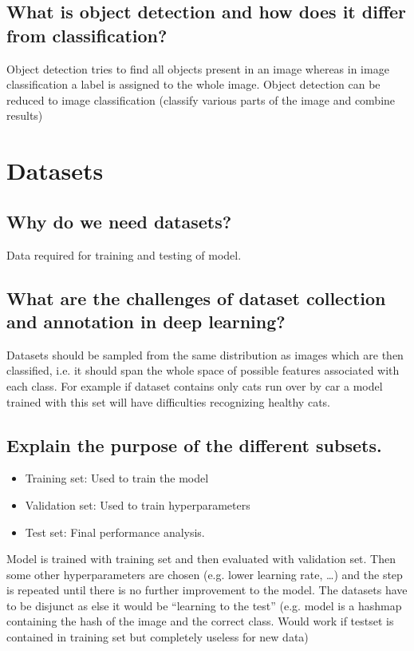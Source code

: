 \subsection{What is object detection and how does it differ from classification?}
Object detection tries to find all objects present in an image whereas in image classification a label is assigned to the whole image. Object detection can be reduced to image classification (classify various parts of the image and combine results)

%
\section{Datasets}
\subsection{Why do we need datasets?}
Data required for training and testing of model. 
\subsection{What are the challenges of dataset collection and annotation in deep learning?}Datasets should be sampled from the same distribution as images which are then classified, i.e. it should span the whole space of possible features associated with each class. For example if dataset contains only cats run over by car a model trained with this set will have difficulties recognizing healthy cats.
\subsection{Explain the purpose of the different subsets.}
\begin{itemize}
\item Training set: Used to train the model
\item Validation set: Used to train hyperparameters
\item Test set: Final performance analysis. 
\end{itemize}
Model is trained with training set and then evaluated with validation set. Then some other hyperparameters are chosen (e.g. lower learning rate, \ldots) and the step is repeated until there is no further improvement to the model. The datasets have to be disjunct as else it would be ``learning to the test'' (e.g. model is a hashmap containing the hash of the image and the correct class. Would work if testset is contained in training set but completely useless for new data)

